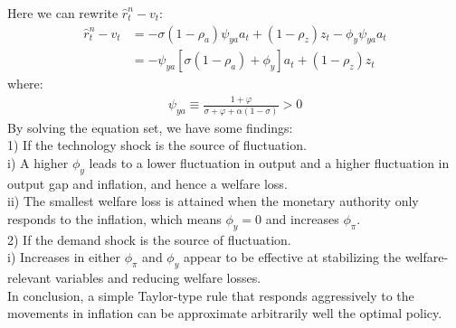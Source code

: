 \documentclass{article}
\numberwithin{equation}{section}
\begin{document}
Here we can rewrite $\hat{r}^n_t - v_t$:
	\begin{align*}
		\hat{r}^n_t - v_t &= - \sigma(1 - \rho_a)\psi_{ya}a_t + (1 - \rho_z)z_t - \phi_y\psi_{ya}a_t\\
		&= -\psi_{ya}[\sigma(1 - \rho_a) + \phi_y]a_t + (1 - \rho_z)z_t
	\end{align*}
where:
	\begin{align*}
		\psi_{ya} \equiv \frac{1 + \varphi}{\sigma + \varphi + \alpha(1 - \sigma)} > 0
	\end{align*}
By solving the equation set, we have some findings:\\
1) If the technology shock is the source of fluctuation.\\
\indent i) A higher $\phi_y$ leads to a lower fluctuation in output and a higher fluctuation in output gap and inflation, and hence a welfare loss.\\
\indent ii) The smallest welfare loss is attained when the monetary authority only responds to the inflation, which means $\phi_y = 0$ and increases $\phi_\pi$.\\
2) If the demand shock is the source of fluctuation.\\
\indent i) Increases in either $\phi_\pi$ and $\phi_y$ appear to be effective at stabilizing the welfare-relevant variables and reducing welfare losses.\\
In conclusion, a simple Taylor-type rule that responds aggressively to the movements in inflation can be approximate arbitrarily well the optimal policy.
\end{document}
